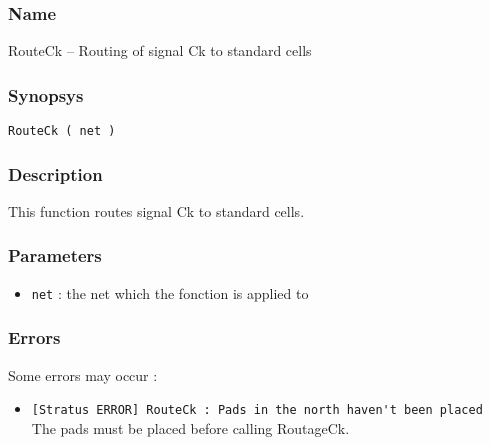 \subsubsection{Name}

RouteCk -- Routing of signal Ck to standard cells

\subsubsection{Synopsys}

\begin{verbatim}
RouteCk ( net )
\end{verbatim}

\subsubsection{Description}

This function routes signal Ck to standard cells.
    
\subsubsection{Parameters}

\begin{itemize}
    \item \verb-net- : the net which the fonction is applied to
\end{itemize}
    
%
%
\subsubsection{Errors}

Some errors may occur :
\begin{itemize}
    \item \verb-[Stratus ERROR] RouteCk : Pads in the north haven't been placed-\\The pads must be placed before calling RoutageCk.
\end{itemize}

